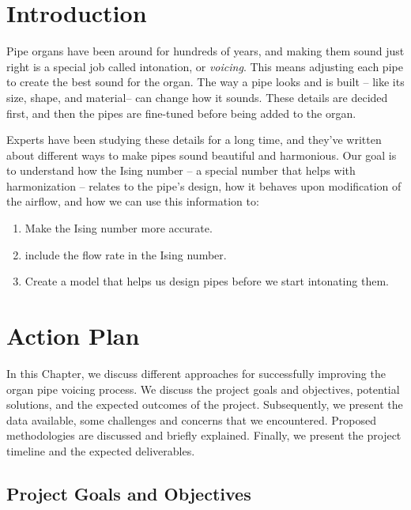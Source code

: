 \documentclass{psu-report}
\begin{document}

\startbody

\chapter{Introduction}

Pipe organs have been around for hundreds of years, and making them sound just
right is a special job called intonation, or \emph{voicing}.
This means adjusting each pipe to create the best sound for the organ.
The way a pipe looks and is built -- like its size, shape, and material-- can
change how it sounds.
These details are decided first, and then the pipes are fine-tuned before being
added to the organ.

Experts have been studying these details for a long time, and they’ve written
about different ways to make pipes sound beautiful and harmonious.
Our goal is to understand how the Ising number -- a special number that helps
with harmonization -- relates to the pipe’s design, how it behaves upon modification of
the airflow, and how we can use this information to:
\begin{enumerate}
    \item Make the Ising number more accurate.
    \item include the flow rate in the Ising number.
    \item Create a model that helps us design pipes before we start intonating them.
\end{enumerate}

\chapter{Action Plan}

In this Chapter, we discuss different approaches for successfully improving the
organ pipe voicing process.
We discuss the project goals and objectives, potential solutions, and the
expected outcomes of the project.
Subsequently, we present the data available, some challenges and concerns that
we encountered.
Proposed methodologies are discussed and briefly explained.
Finally, we present the project timeline and the expected deliverables.

\section{Project Goals and Objectives}
\end{document}
